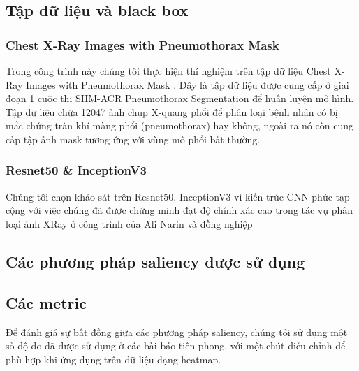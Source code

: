 \subsection{Tập dữ liệu và black box}
\subsubsection{Chest X-Ray Images with Pneumothorax Mask}
Trong công trình này chúng tôi thực hiện thí nghiệm trên tập dữ liệu Chest X-Ray Images with Pneumothorax Mask \cite{pneumothorax}. Đây là tập dữ liệu được cung cấp ở giai đoạn 1 cuộc thi SIIM-ACR Pneumothorax Segmentation để huấn luyện mô hình. Tập dữ liệu chứa 12047 ảnh chụp X-quang phổi để phân loại bệnh nhân có bị mắc chứng tràn khí màng phổi (pneumothorax) hay không, ngoài ra nó còn cung cấp tập ảnh mask tương ứng với vùng mô phổi bất thường. 


\subsubsection{Resnet50 \& InceptionV3}
Chúng tôi chọn khảo sát trên Resnet50, InceptionV3 vì kiến trúc CNN phức tạp cộng với việc chúng đã được chứng minh đạt độ chính xác cao trong tác vụ phân loại ảnh XRay ở công trình của Ali Narin và đồng nghiệp \cite{covidXray}




\subsection{Các phương pháp saliency được sử dụng}

\subsection{Các metric}
Để đánh giá sự bất đồng giữa các phương pháp saliency, chúng tôi sử dụng một số độ đo đã được sử dụng ở các bài báo tiên phong, với một chút điều chỉnh để phù hợp khi ứng dụng trên dữ liệu dạng heatmap.